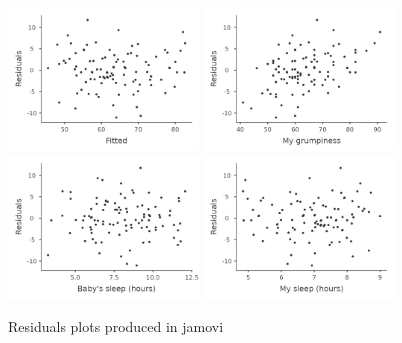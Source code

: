 \documentclass[
  a4paper,
]{book}
\begin{document}
\begin{figure}[H]

\begin{minipage}[t]{\linewidth}

{\centering 

\includegraphics[width=0.45\textwidth,height=\textheight]{images/fig12-20a.png}
\includegraphics[width=0.45\textwidth,height=\textheight]{images/fig12-20b.png}
\includegraphics[width=0.45\textwidth,height=\textheight]{images/fig12-20c.png}
\includegraphics[width=0.45\textwidth,height=\textheight]{images/fig12-20d.png}

}

\end{minipage}%

\caption{\label{fig-fig12-20}Residuals plots produced in jamovi}

\end{figure}
\end{document}
